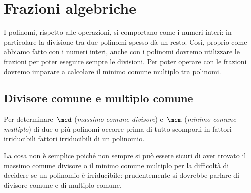 


\chapter{Frazioni algebriche}

% 

I polinomi, rispetto alle operazioni, si comportano come i numeri interi:
in particolare la divisione tra due polinomi spesso dà un resto. 
Così, proprio come abbiamo fatto con i numeri interi, anche con i 
polinomi 
dovremo utilizzare le frazioni per poter eseguire sempre le divisioni. 
Per poter operare con le frazioni dovremo imparare a calcolare il minimo 
comune multiplo tra polinomi.

\section{Divisore comune e multiplo comune}
\label{sec:frazalg_MCDemcm}

Per determinare~\(\mcd\) (\emph{massimo comune divisore}) 
e~\(\mcm\) (\emph{minimo comune multiplo}) di due o più polinomi occorre 
prima di tutto scomporli in fattori irriducibili
{fattori irriducibili di un polinomio}.

\begin{osservazione}{}{} 
La cosa non è semplice poiché non sempre si può essere sicuri di aver 
trovato il massimo comune divisore o il minimo comune multiplo
per la difficoltà di decidere se un polinomio è irriducibile: 
prudentemente si dovrebbe parlare di divisore comune e di multiplo 
comune.
\end{osservazione}

